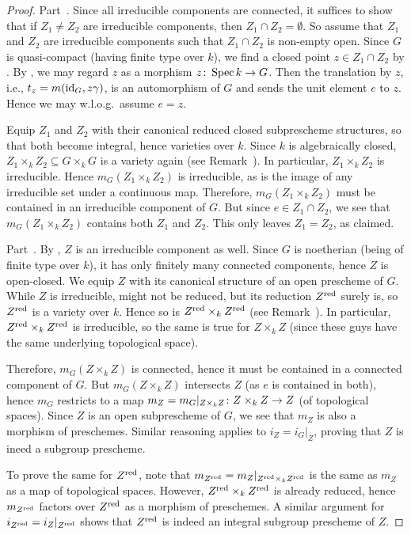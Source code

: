 \documentclass[a4paper,parskip=half,numbers=enddot, DIV=12]{scrreprt}
\begin{document}
\begin{proof}
	Part~. Since all irreducible components are connected, it suffices to show that if $Z_1\neq Z_2$ are irreducible components, then $Z_1\cap Z_2=\emptyset$. So assume that $Z_1$ and $Z_2$ are irreducible components such that $Z_1\cap Z_2$ is non-empty open. Since $G$ is quasi-compact (having finite type over $k$), we find a closed point $z\in Z_1\cap Z_2$ by \cite[Proposition~2.1.1]{alggeo1}. By , we may regard $z$ as a morphism $z\colon \Spec k\morphism G$. Then the translation by $z$, i.e., $t_z=m(\operatorname{id}_G,z\gamma)$, is an automorphism of $G$ and sends the unit element $e$ to $z$. Hence we may w.l.o.g.\ assume $e=z$.
	
	Equip $Z_1$ and $Z_2$ with their canonical reduced closed subprescheme structures, so that both become integral, hence varieties over $k$. Since $k$ is algebraically closed, $Z_1\times_kZ_2\subseteq G\times_kG$ is a variety again (see Remark~). In particular, $Z_1\times_kZ_2$ is irreducible. Hence $m_G(Z_1\times_kZ_2)$ is irreducible, as is the image of any irreducible set under a continuous map. Therefore, $m_G(Z_1\times_kZ_2)$ must be contained in an irreducible component of $G$. But since $e\in Z_1\cap Z_2$, we see that $m_G(Z_1\times_kZ_2)$ contains both $Z_1$ and $Z_2$. This only leaves $Z_1=Z_2$, as claimed.
	
	Part~. By , $Z$ is an irreducible component as well. Since $G$ is noetherian (being of finite type over $k$), it has only finitely many connected components, hence $Z$ is open-closed. We equip $Z$ with its canonical structure of an open prescheme of $G$. While $Z$ is irreducible, might not be reduced, but its reduction $Z^{\mathrm{red}}$ surely is, so $Z^{\mathrm{red}}$ is a variety over $k$. Hence so is $Z^{\mathrm{red}}\times_k Z^{\mathrm{red}}$ (see Remark~). In particular, $Z^{\mathrm{red}}\times_k Z^{\mathrm{red}}$ is irreducible, so the same is true for $Z\times_kZ$ (since these guys have the same underlying topological space).
	
	Therefore, $m_G(Z\times_kZ)$ is connected, hence it must be contained in a connected component of $G$. But $m_G(Z\times_kZ)$ intersects $Z$ (as $e$ is contained in both), hence $m_G$ restricts to a map $m_Z=m_G|_{Z\times_kZ}\colon Z\times_kZ\morphism Z$ (of topological spaces). Since $Z$ is an open subprescheme of $G$, we see that $m_Z$ is also a morphism of preschemes. Similar reasoning applies to $i_Z=i_G|_Z$, proving that $Z$ is ineed a subgroup prescheme.
	
	To prove the same for $Z^{\mathrm{red}}$, note that $m_{Z^{\mathrm{red}}}=m_Z|_{Z^{\mathrm{red}}\times_kZ^{\mathrm{red}}}$ is the same as $m_Z$ as a map of topological spaces. However, $Z^{\mathrm{red}}\times_k Z^{\mathrm{red}}$ is already reduced, hence $m_{Z^{\mathrm{red}}}$ factors over $Z^{\mathrm{red}}$ as a morphism of preschemes. A similar argument for $i_{Z^{\mathrm{red}}}=i_Z|_{Z^{\mathrm{red}}}$ shows that $Z^{\mathrm{red}}$ is indeed an integral subgroup prescheme of $Z$.
\end{proof}
\end{document}
